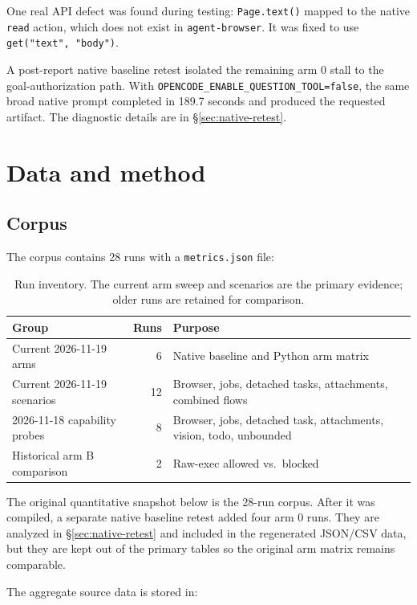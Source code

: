 \documentclass[11pt]{article}
\newcommand{\code}[1]{\texttt{#1}}
\begin{document}
One real API defect was found during testing: \code{Page.text()} mapped to the
native \code{read} action, which does not exist in \code{agent-browser}.  It was
fixed to use \code{get("text", "body")}.

A post-report native baseline retest isolated the remaining arm 0 stall to the
goal-authorization path.  With \code{OPENCODE\_ENABLE\_QUESTION\_TOOL=false},
the same broad native prompt completed in 189.7 seconds and produced the
requested artifact.  The diagnostic details are in \S\ref{sec:native-retest}.

\section{Data and method}

\subsection{Corpus}

The corpus contains 28 runs with a \code{metrics.json} file:

\begin{table}[h]
\centering
\begin{tabular}{p{4.2cm}r p{8.2cm}}
\toprule
\textbf{Group} & \textbf{Runs} & \textbf{Purpose} \\
\midrule
Current 2026-11-19 arms & 6 & Native baseline and Python arm matrix \\
Current 2026-11-19 scenarios & 12 & Browser, jobs, detached tasks, attachments, combined flows \\
2026-11-18 capability probes & 8 & Browser, jobs, detached task, attachments, vision, todo, unbounded \\
Historical arm B comparison & 2 & Raw-exec allowed vs.\ blocked \\
\bottomrule
\end{tabular}
\caption{Run inventory.  The current arm sweep and scenarios are the primary
evidence; older runs are retained for comparison.}
\end{table}

The original quantitative snapshot below is the 28-run corpus.  After it was
compiled, a separate native baseline retest added four arm 0 runs.  They are
analyzed in \S\ref{sec:native-retest} and included in the regenerated JSON/CSV
data, but they are kept out of the primary tables so the original arm matrix
remains comparable.

The aggregate source data is stored in:
\end{document}
